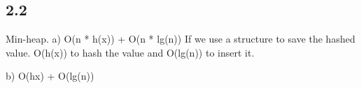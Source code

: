 \subsection*{2.2}
Min-heap.
a) 
O(n * h(x)) + O(n * lg(n)) If we use a structure to save the hashed value. 
O(h(x)) to hash the value and O(lg(n)) to insert it.

b)
O(hx) + O(lg(n))



